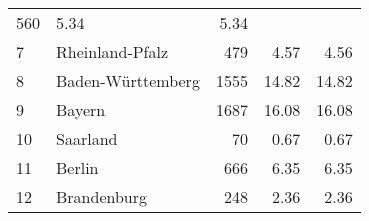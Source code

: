 \begin{longtable}{lXrrr}
       \num{560} &
       \num[round-mode=places,round-precision=2]{5.34} &
         \num[round-mode=places,round-precision=2]{5.34} \\

     7 &
     \multicolumn{1}{X}{ Rheinland-Pfalz   } &


       \num{479} &
       \num[round-mode=places,round-precision=2]{4.57} &
         \num[round-mode=places,round-precision=2]{4.56} \\

     8 &
     \multicolumn{1}{X}{ Baden-Württemberg   } &


       \num{1555} &
       \num[round-mode=places,round-precision=2]{14.82} &
         \num[round-mode=places,round-precision=2]{14.82} \\

     9 &
     \multicolumn{1}{X}{ Bayern   } &


       \num{1687} &
       \num[round-mode=places,round-precision=2]{16.08} &
         \num[round-mode=places,round-precision=2]{16.08} \\

     10 &
     \multicolumn{1}{X}{ Saarland   } &


       \num{70} &
       \num[round-mode=places,round-precision=2]{0.67} &
         \num[round-mode=places,round-precision=2]{0.67} \\

     11 &
     \multicolumn{1}{X}{ Berlin   } &


       \num{666} &
       \num[round-mode=places,round-precision=2]{6.35} &
         \num[round-mode=places,round-precision=2]{6.35} \\

     12 &
     \multicolumn{1}{X}{ Brandenburg   } &


       \num{248} &
       \num[round-mode=places,round-precision=2]{2.36} &
         \num[round-mode=places,round-precision=2]{2.36} \\


\end{longtable}
